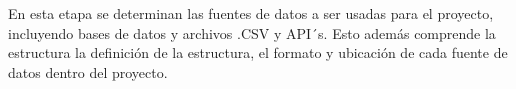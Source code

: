 En esta etapa se determinan las fuentes de datos a ser usadas para el proyecto, incluyendo bases de datos y archivos .CSV y API´s. Esto además comprende la estructura la definición de la estructura, el formato y ubicación de cada fuente de datos dentro del proyecto.
